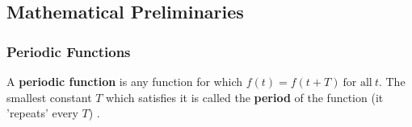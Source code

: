 \documentclass[10pt]{article}
\begin{document}
%



\subsection{Mathematical Preliminaries}



\subsubsection{Periodic Functions}
\hspace{\parindent} A \textbf{periodic function} is any function for which $f(t) = f(t + T) \: \text{for all} \: t$.
The smallest constant $T$ which satisfies it is called the \textbf{period} of the function (it 'repeats' every $T$) \cite{hsu1970fourier}.
\end{document}
